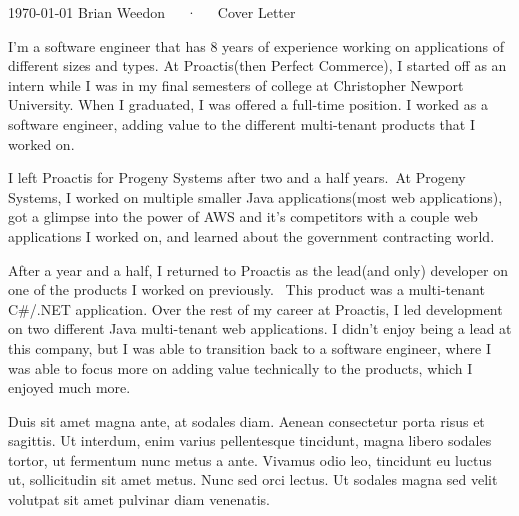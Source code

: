 \documentclass[11pt, a4paper]{awesome-cv}
\begin{document}
\makecvheader[C]

\makecvfooter
{\today}
{Brian Weedon~~~·~~~Cover Letter}
{}

\makelettertitle

\begin{cvletter}

    I'm a software engineer that has 8 years of experience working on applications of different sizes and types. At Proactis(then Perfect Commerce), I started off as an intern while I was in my final semesters of college at Christopher Newport University. When I graduated, I was offered a full-time position. I worked as a software engineer, adding value to the different multi-tenant products that I worked on. 

    I left Proactis for Progeny Systems after two and a half years. At Progeny Systems, I worked on multiple smaller Java applications(most web applications), got a glimpse into the power of AWS and it's competitors with a couple web applications I worked on, and learned about the government contracting world. 

    After a year and a half, I returned to Proactis as the lead(and only) developer on one of the products I worked on previously.  This product was a multi-tenant C\#/.NET application. Over the rest of my career at Proactis, I led development on two different Java multi-tenant web applications. I didn't enjoy being a lead at this company, but I was able to transition back to a software engineer, where I was able to focus more on adding value technically to the products, which I enjoyed much more.



    Duis sit amet magna ante, at sodales diam. Aenean consectetur porta risus et sagittis. Ut interdum, enim varius pellentesque tincidunt, magna libero sodales tortor, ut fermentum nunc metus a ante. Vivamus odio leo, tincidunt eu luctus ut, sollicitudin sit amet metus. Nunc sed orci lectus. Ut sodales magna sed velit volutpat sit amet pulvinar diam venenatis.

\end{cvletter}


\makeletterclosing
\end{document}
